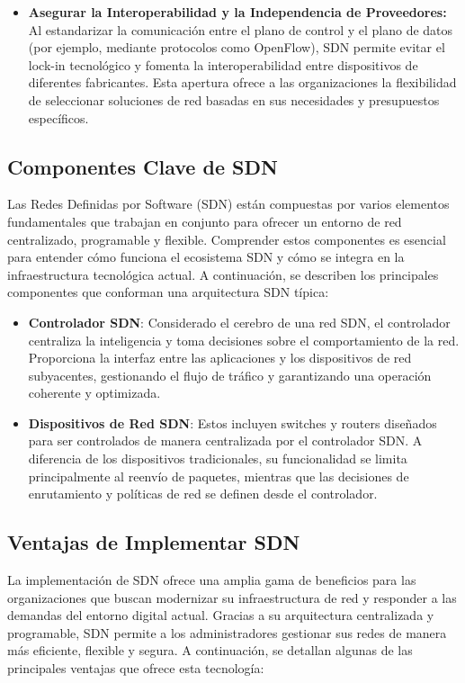 {\begin{itemize}
            \item \textbf{Asegurar la Interoperabilidad y la Independencia de Proveedores:} Al estandarizar la comunicación entre el plano de control y el plano de datos (por ejemplo, mediante protocolos como OpenFlow), SDN permite evitar el lock-in tecnológico y fomenta la interoperabilidad entre dispositivos de diferentes fabricantes. Esta apertura ofrece a las organizaciones la flexibilidad de seleccionar soluciones de red basadas en sus necesidades y presupuestos específicos.
        \end{itemize}
                
        \subsection{Componentes Clave de SDN}
            Las Redes Definidas por Software (SDN) están compuestas por varios elementos fundamentales que trabajan en conjunto para ofrecer un entorno de red centralizado, programable y flexible. Comprender estos componentes es esencial para entender cómo funciona el ecosistema SDN y cómo se integra en la infraestructura tecnológica actual. A continuación, se describen los principales componentes que conforman una arquitectura SDN típica:

            \begin{itemize}
                \item \textbf{Controlador SDN}: Considerado el cerebro de una red SDN, el controlador centraliza la inteligencia y toma decisiones sobre el comportamiento de la red. Proporciona la interfaz entre las aplicaciones y los dispositivos de red subyacentes, gestionando el flujo de tráfico y garantizando una operación coherente y optimizada.
                \item \textbf{Dispositivos de Red SDN}: Estos incluyen switches y routers diseñados para ser controlados de manera centralizada por el controlador SDN. A diferencia de los dispositivos tradicionales, su funcionalidad se limita principalmente al reenvío de paquetes, mientras que las decisiones de enrutamiento y políticas de red se definen desde el controlador.
            \end{itemize}
        
        \subsection{Ventajas de Implementar SDN}
            La implementación de SDN ofrece una amplia gama de beneficios para las organizaciones que buscan modernizar su infraestructura de red y responder a las demandas del entorno digital actual. Gracias a su arquitectura centralizada y programable, SDN permite a los administradores gestionar sus redes de manera más eficiente, flexible y segura. A continuación, se detallan algunas de las principales ventajas que ofrece esta tecnología:

}
